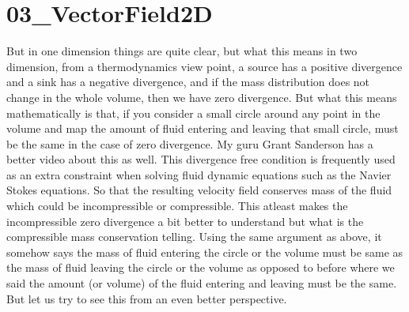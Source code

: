 \documentclass{article}
\begin{document}
\section*{03\_VectorField2D}
But in one dimension things are quite clear, but what this means in two dimension, from a thermodynamics view point, a source has a positive divergence and a sink has a negative divergence, and if the mass distribution does not change in the whole volume, then we have zero divergence. But what this means mathematically is that, if you consider a small circle around any point in the volume and map the amount of fluid entering and leaving that small circle, must be the same in the case of zero divergence. My guru Grant Sanderson has a better video about this as well. This divergence free condition is frequently used as an extra constraint when solving fluid dynamic equations such as the Navier Stokes equations. So that the resulting velocity field conserves mass of the fluid which could be incompressible or compressible. This atleast makes the incompressible zero divergence a bit better to understand but what is the compressible mass conservation telling. Using the same argument as above, it somehow says the mass of fluid entering the circle or the volume must be same as the mass of fluid leaving the circle or the volume as opposed to before where we said the amount (or volume) of the fluid entering and leaving must be the same. But let us try to see this from an even better perspective.









\end{document}
